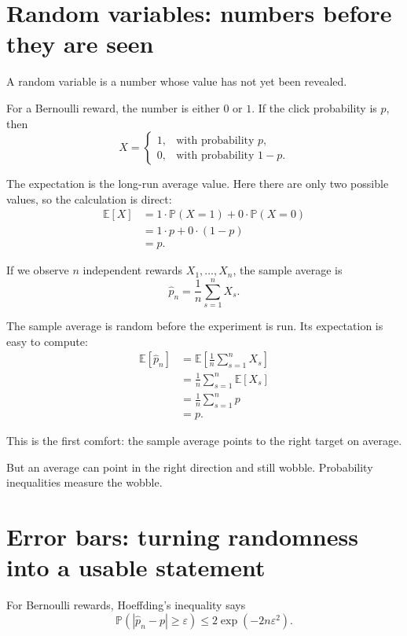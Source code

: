 \documentclass[en,nofont,11pt]{elegantbook}
\newcommand{\E}{\mathbb{E}}
\newcommand{\Pp}{\mathbb{P}}
\begin{document}
\chapter{Random variables: numbers before they are seen}

A random variable is a number whose value has not yet been revealed.

For a Bernoulli reward, the number is either $0$ or $1$.  If the click probability is $p$, then
\[
X=\begin{cases}
1, & \text{with probability }p,\\
0, & \text{with probability }1-p.
\end{cases}
\]

The expectation is the long-run average value.  Here there are only two possible values, so the calculation is direct:
\begin{align}
\E[X]
&= 1\cdot \Pp(X=1) + 0\cdot \Pp(X=0) \\
&= 1\cdot p + 0\cdot (1-p) \\
&= p. \label{eq:bernoulli_mean}
\end{align}

If we observe $n$ independent rewards $X_1,\ldots,X_n$, the sample average is
\[
\widehat p_n = \frac{1}{n}\sum_{s=1}^n X_s.
\]

The sample average is random before the experiment is run.  Its expectation is easy to compute:
\begin{align}
\E[\widehat p_n]
&= \E\left[\frac{1}{n}\sum_{s=1}^n X_s\right] \\
&= \frac{1}{n}\sum_{s=1}^n \E[X_s] \\
&= \frac{1}{n}\sum_{s=1}^n p \\
&= p. \label{eq:sample_mean_unbiased}
\end{align}

This is the first comfort: the sample average points to the right target on average.

But an average can point in the right direction and still wobble.  Probability inequalities measure the wobble.

\chapter{Error bars: turning randomness into a usable statement}

For Bernoulli rewards, Hoeffding's inequality says
\begin{equation}
\Pp\left(\left|\widehat p_n-p\right|\geq \varepsilon\right)
\leq 2\exp(-2n\varepsilon^2). \label{eq:hoeffding}
\end{equation}
\end{document}
